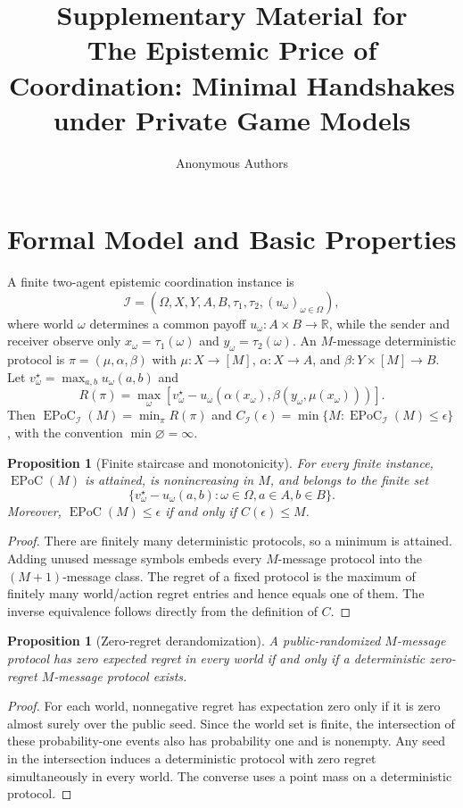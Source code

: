 \documentclass[letterpaper,10pt]{article}
\title{Supplementary Material for\\
The Epistemic Price of Coordination: Minimal Handshakes under Private Game Models}
\author{Anonymous Authors}
\date{}
\newtheorem{proposition}[theorem]{Proposition}
\newcommand{\EPoC}{\operatorname{EPoC}}
\newcommand{\I}{\mathcal{I}}
\begin{document}
\maketitle

\section{Formal Model and Basic Properties}

A finite two-agent epistemic coordination instance is
\[
\I=(\Omega,X,Y,A,B,\tau_1,\tau_2,(u_\omega)_{\omega\in\Omega}),
\]
where world $\omega$ determines a common payoff
$u_\omega:A\times B\to\mathbb R$, while the sender and receiver observe only
$x_\omega=\tau_1(\omega)$ and $y_\omega=\tau_2(\omega)$.
An $M$-message deterministic protocol is
$\pi=(\mu,\alpha,\beta)$ with
$\mu:X\to[M]$, $\alpha:X\to A$, and $\beta:Y\times[M]\to B$.
Let $v_\omega^\star=\max_{a,b}u_\omega(a,b)$ and
\[
R(\pi)=\max_\omega\left[v_\omega^\star-
 u_\omega(\alpha(x_\omega),\beta(y_\omega,\mu(x_\omega)))\right].
\]
Then $\EPoC_\I(M)=\min_\pi R(\pi)$ and
$C_\I(\epsilon)=\min\{M:\EPoC_\I(M)\le\epsilon\}$, with the convention
$\min\varnothing=\infty$.

\begin{proposition}[Finite staircase and monotonicity]\label{prop:staircase}
For every finite instance, $\EPoC(M)$ is attained, is nonincreasing in $M$,
and belongs to the finite set
\[
\{v_\omega^\star-u_\omega(a,b):\omega\in\Omega,a\in A,b\in B\}.
\]
Moreover, $\EPoC(M)\le\epsilon$ if and only if $C(\epsilon)\le M$.
\end{proposition}
\begin{proof}
There are finitely many deterministic protocols, so a minimum is attained.
Adding unused message symbols embeds every $M$-message protocol into the
$(M+1)$-message class. The regret of a fixed protocol is the maximum of
finitely many world/action regret entries and hence equals one of them. The
inverse equivalence follows directly from the definition of $C$.
\end{proof}

\begin{proposition}[Zero-regret derandomization]
A public-randomized $M$-message protocol has zero expected regret in every world
if and only if a deterministic zero-regret $M$-message protocol exists.
\end{proposition}
\begin{proof}
For each world, nonnegative regret has expectation zero only if it is zero
almost surely over the public seed. Since the world set is finite, the
intersection of these probability-one events also has probability one and is
nonempty. Any seed in the intersection induces a deterministic protocol with
zero regret simultaneously in every world. The converse uses a point mass on a
deterministic protocol.
\end{proof}
\end{document}
